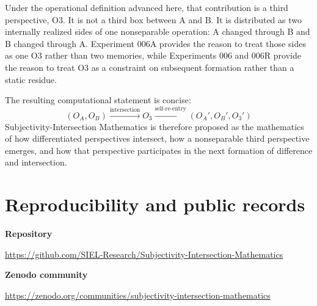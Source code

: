 \documentclass[11pt,a4paper]{article}
\newcommand{\OA}{\ensuremath{O_{A}}}
\newcommand{\OB}{\ensuremath{O_{B}}}
\newcommand{\Othree}{\ensuremath{O_{3}}}
\begin{document}
Under the operational definition advanced here, that contribution is a third perspective, O3. It is not a third box between A and B. It is distributed as two internally realized sides of one nonseparable operation: A changed through B and B changed through A. Experiment 006A provides the reason to treat those sides as one O3 rather than two memories, while Experiments 006 and 006R provide the reason to treat O3 as a constraint on subsequent formation rather than a static residue.

The resulting computational statement is concise:
\[
 \boxed{(\OA,\OB)\xrightarrow{\text{intersection}}\Othree
 \xrightarrow{\text{self-re-entry}}(\OA',\OB',\Othree')}
\]
Subjectivity-Intersection Mathematics is therefore proposed as the mathematics of how differentiated perspectives intersect, how a nonseparable third perspective emerges, and how that perspective participates in the next formation of difference and intersection.

\appendix
\section{Reproducibility and public records}

\noindent\textbf{Repository}
\begin{center}
\small\url{https://github.com/SIEL-Research/Subjectivity-Intersection-Mathematics}
\end{center}

\noindent\textbf{Zenodo community}
\begin{center}
\small\url{https://zenodo.org/communities/subjectivity-intersection-mathematics}
\end{center}
\end{document}
